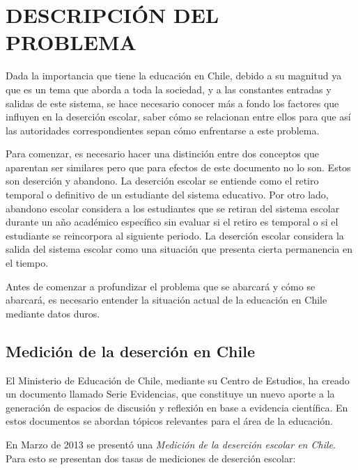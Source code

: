 \chapter{DESCRIPCIÓN DEL PROBLEMA}
\label{ch:descprob}
Dada la importancia que tiene la educación en Chile, debido a su magnitud ya que es un tema que aborda a toda la sociedad, y a las constantes entradas y salidas de este sistema, se hace necesario conocer más a fondo los factores que influyen en la deserción escolar, saber cómo se relacionan entre ellos para que así las autoridades correspondientes sepan cómo enfrentarse a este problema.

Para comenzar, es necesario hacer una distinción entre dos conceptos que aparentan ser similares pero que para efectos de este documento no lo son. Estos son deserción y abandono. La deserción escolar se entiende como el retiro temporal o definitivo de un estudiante del sistema educativo. Por otro lado, abandono escolar considera a los estudiantes que se retiran del sistema escolar durante un año académico específico sin evaluar si el retiro es temporal o si el estudiante se reincorpora al siguiente periodo. La deserción escolar considera la salida del sistema escolar como una situación que presenta cierta permanencia en el tiempo\cite{mineduc}.

Antes de comenzar a profundizar el problema que se abarcará y cómo se abarcará, es necesario entender la situación actual de la educación en Chile mediante datos duros.
\newpage
\section{Medición de la deserción en Chile}

El Ministerio de Educación de Chile, mediante su Centro de Estudios, ha creado un documento llamado Serie Evidencias, que constituye un nuevo aporte a la generación de espacios de discusión y reflexión en base a evidencia científica. En estos documentos se abordan tópicos relevantes para el área de la educación.

En Marzo de 2013 se presentó una \textit{Medición de la deserción escolar en Chile}. Para esto se presentan dos tasas de mediciones de deserción escolar\cite{serieevidencias}:

